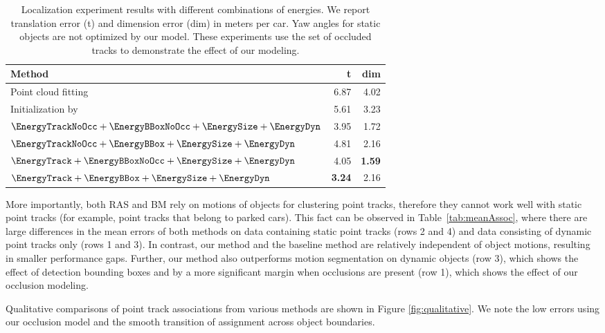 \begin{wraptable}[11]{r}{0.5\textwidth}\scriptsize\centering
  \begin{tabular}{lrr}
    \toprule
    Method & t & dim \\
    \midrule
    Point cloud fitting
    & 6.87 & 4.02\\
    Initialization by~\cite{Song_Chandraker_2014}
    & 5.61 & 3.23\\
    $\EnergyTrackNoOcc + \EnergyBBoxNoOcc +\EnergySize+\EnergyDyn$ 
    & 3.95  & 1.72\\        
    $\EnergyTrackNoOcc + \EnergyBBox +\EnergySize+\EnergyDyn$        
    & 4.81  & 2.16\\        
    $\EnergyTrack + \EnergyBBoxNoOcc +\EnergySize+\EnergyDyn$      
    & 4.05  & {\bf 1.59}\\        
    $\EnergyTrack + \EnergyBBox +\EnergySize+\EnergyDyn$             
    & {\bf 3.24}  & 2.16\\
    \bottomrule
  \end{tabular}
  \caption{Localization experiment results with different combinations of energies. We report translation error (t) and dimension error (dim) in meters per car. Yaw angles for static objects are not optimized by our model. These experiments use the set of occluded tracks to demonstrate the effect of our modeling.}
  \label{tab:localizationExperiment}
\end{wraptable}

More importantly, both RAS and BM rely on motions of objects for clustering point tracks, therefore they cannot work well with static point tracks (for example, point tracks that belong to parked cars). This fact can be observed in Table~\ref{tab:meanAssoc}, where there are large differences in the mean errors of both methods on data containing static point tracks (rows 2 and 4) and data consisting of dynamic point tracks only (rows 1 and 3). In contrast, our method and the baseline method are relatively independent of object motions, resulting in smaller performance gaps. Further, our method also outperforms motion segmentation on dynamic objects (row 3), which shows the effect of detection bounding boxes and by a more significant margin when occlusions are present (row 1), which shows the effect of our occlusion modeling.




Qualitative comparisons of point track associations from various methods are shown in Figure \ref{fig:qualitative}. We note the low errors using our occlusion model and the smooth transition of assignment across object boundaries.



